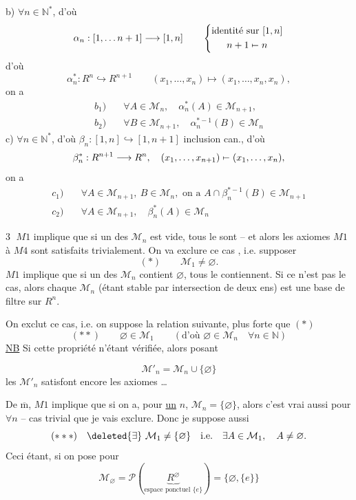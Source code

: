 b) $\forall n\in\mathbb N^*$, d'où
\[
\alpha_n:[1,\ldots n+1]\longrightarrow[1,n]\qquad
\left\{\begin{gathered}\text{identité sur }[1,n]\\ n+1\mathrel{\mapstochar\relbar}n\end{gathered}\right.
\]
d'où 
\[
\alpha_n^*:R^n\hookrightarrow R^{n+1}\qquad(x_1,\ldots,x_n)\longmapsto(x_1,\ldots,x_n,x_n),
\]
on a
\[
\begin{aligned}
b_1)\quad&\forall A\in\mathcal M_n,\quad\alpha_n^*(A)\in\mathcal M_{n+1},\\
b_2)\quad&\forall B\in\mathcal M_{n+1},\quad\alpha_n^{*-1}(B)\in\mathcal M_n
\end{aligned}
\]
c) $\forall n\in\mathbb N^*$, d'où $\beta_n:[1,n]\hookrightarrow[1,n+1]$ inclusion can., d'où
\[
\beta_n^*:R^{n+1}\longrightarrow R^n,\quad(x_1,\ldots,x_{n+1})\mathrel{\mapstochar\relbar}(x_1,\ldots,x_n),
\]
on a
\[
\begin{aligned}
c_1)\quad&\forall A\in\mathcal M_{n+1},\ B\in\mathcal M_n,\text{ on a }A\cap\beta_n^{*-1}(B)\in\mathcal M_{n+1}\\
c_2)\quad&\forall A\in\mathcal M_{n+1},\quad\beta_n^*(A)\in\mathcal M_n
\end{aligned}
\]

\textcircled{3} $M1$ implique que si un des $\mathcal M_n$ est vide, tous le sont -- et alors les axiomes $M1$ à $M4$ sont satisfaits trivialement. On va exclure ce cas , i.e. supposer
\[
(*)\qquad\mathcal M_1\ne\varnothing.
\]
$M1$ implique que si un des $\mathcal M_n$ contient $\varnothing$, tous le contiennent. Si ce n'est pas le cas, alors chaque $\mathcal M_n$ (étant stable par intersection de deux ens) est une base de filtre sur $R^n$.

On exclut ce cas, i.e. on suppose la relation suivante, plus forte que $(*)$
\[
(**)\qquad\varnothing\in\mathcal M_1\qquad(\text{d'où }\varnothing\in\mathcal M_n\quad\forall n\in\mathbb N)
\]
\uline{NB} Si cette propriété n'étant vérifiée, alors posant

\[
\mathcal M'_n=\mathcal M_n\cup\{\varnothing\}
\]
les $\mathcal M'_n$ satisfont encore les axiomes \ldots


De $\overline{\mathrm m}$,  $M1$ implique que si on a, pour \uline{un} $n$,  $\mathcal M_n=\{\varnothing\}$, alors c'est vrai aussi pour $\forall n$ -- cas trivial  que je vais exclure. Donc je suppose aussi
\[
(***)\quad\deleted{\exists}\ \mathcal M_1\ne\{\varnothing\}\quad\text{i.e.}\quad\exists A\in\mathcal M_1,\quad A\ne\varnothing.
\]
Ceci étant, si on pose pour 
\[
\mathcal M_\varnothing=\mathcal P(\underbrace{R^\varnothing}_{\text{espace ponctuel }\{e\}})=\{\varnothing,\{e\}\}
\]


